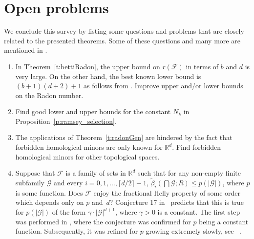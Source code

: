 \documentclass[a4paper,12pt]{amsart}
\newcommand{\R}{\mathbb{R}} 	%
\newcommand{\F}{\mathcal{F}} 	%
\theoremstyle{definition}
\begin{document}
\section{Open problems}\label{sec:open}
We conclude this survey by listing some questions and problems that are closely related to the presented theorems. Some of these questions and many more are mentioned in \cite{Barany_Kalai, bettiRadon, goaoc2024intersectionpatternsspacesforbidden, kalai_conjectures, gil_imre_birthday}. 
\begin{enumerate}
\item In Theorem~\ref{t:bettiRadon}, the upper bound on $r(\mathcal F)$ in terms of $b$ and $d$ is very large. On the other hand, the best known lower bound is $(b+1)(d+2)+1$ as follows from \cite[Example 2]{hb17}. Improve upper and/or lower bounds on the Radon number.
\item Find good lower and upper bounds for the constant $N_k$ in Proposition~\ref{p:ramsey_selection}.
\item The applications of Theorem~\ref{t:radonGen} are hindered by the fact that forbidden homological minors are only known for $\R^d$. 
Find forbidden homological minors for other topological spaces. 

\item Suppose that $\F$ is a family of sets in $\R^d$ such that for any non-empty finite subfamily $\mathcal G$ and every $i=0,1,\ldots, \lceil d/2\rceil -1$, $\widetilde{\beta}_i(\bigcap \mathcal G;R)\leq p(|\mathcal G|)$, where $p$ is some function. 
Does $\F$ enjoy the fractional Helly property of some order which depends only on $p$ and~$d$?
Conjecture 17 in~\cite{gil_imre_birthday} predicts that this is true for $p(|\mathcal G|)$ of the form $\gamma\cdot|\mathcal G|^{d+1}$,
where $\gamma>0$ is a constant. 
The first step was performed in \cite{goaoc2024intersectionpatternsspacesforbidden}, where the conjecture was confirmed for $p$ being a constant function. Subsequently, it was refined for $p$ growing extremely slowly, see ~\cite{bin2024fractionalhellytheoremset}.
\end{enumerate}



\end{document}
